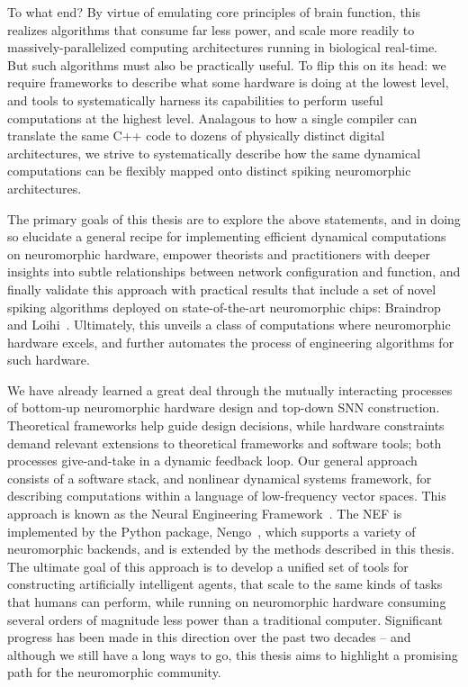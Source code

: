 To what end?
By virtue of emulating core principles of brain function, this realizes algorithms that consume far less power, and scale more readily to massively-parallelized computing architectures running in biological real-time.
But such algorithms must also be practically useful.
To flip this on its head: we require frameworks to describe what some hardware is doing at the lowest level,
and tools to systematically harness its capabilities to perform useful computations at the highest level.
Analagous to how a single compiler can translate the same C++ code
to dozens of physically distinct digital architectures, we strive to systematically describe
how the same dynamical computations can be flexibly mapped onto distinct spiking neuromorphic architectures.

The primary goals of this thesis are to explore the above statements, and in doing so elucidate a general recipe for implementing efficient dynamical computations on neuromorphic hardware, empower theorists and practitioners with deeper insights into subtle relationships between network configuration and function, and finally validate this approach with practical results that include a set of novel spiking algorithms deployed on state-of-the-art neuromorphic chips: Braindrop~\citep{braindrop2019} and Loihi~\citep{davies2018loihi}.
Ultimately, this unveils a class of computations where neuromorphic hardware excels, and further automates the process of engineering algorithms for such hardware.

We have already learned a great deal through the mutually interacting processes of bottom-up neuromorphic hardware design and top-down SNN construction.
Theoretical frameworks help guide design decisions, while hardware constraints demand relevant extensions to theoretical frameworks and software tools; both processes give-and-take in a dynamic feedback loop.
Our general approach consists of a software stack, and nonlinear dynamical systems framework,
for describing computations within a language of low-frequency vector spaces.
This approach is known as the Neural Engineering Framework~\citep[NEF;][]{eliasmith2003a}.
The NEF is implemented by the Python package, Nengo~\citep{bekolay2014}, which supports a variety of neuromorphic backends, and is extended by the methods
described in this thesis.
The ultimate goal of this approach is to develop a unified set of tools for constructing
artificially intelligent agents, that scale to the same kinds of tasks that
humans can perform, while running on neuromorphic hardware consuming several orders of magnitude less power than a traditional computer.
Significant progress has been made in this direction over the past two decades -- and although we still
have a long ways to go, this thesis aims to highlight a promising path for the neuromorphic community.

